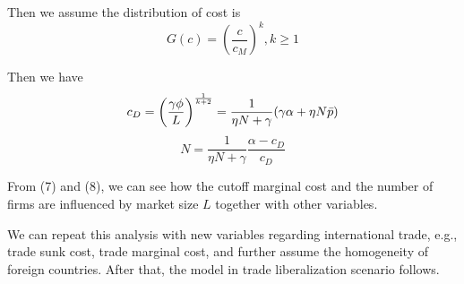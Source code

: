 \documentclass{article}
\begin{document}
Then we assume the distribution of cost is
\begin{equation}
    G(c) = \left(\frac{c}{c_M}\right)^k, k\geq 1
\end{equation}

Then we have
\begin{equation}
    c_D = \left( \frac{\gamma\phi}{L}\right)^\frac{1}{k+2} = \frac{1}{\eta N +\gamma}(\gamma \alpha + \eta N \Bar{p})
\end{equation}
\begin{equation}
    N = \frac{1}{\eta N +\gamma}\frac{\alpha-c_D}{c_D}
\end{equation}

From (7) and (8), we can see how the cutoff marginal cost and the number of firms are influenced by market size $L$ together with other variables.  

We can repeat this analysis with new variables regarding international trade, e.g., trade sunk cost, trade marginal cost, and further assume the homogeneity of foreign countries. After that, the model in trade liberalization scenario follows.
\end{document}
